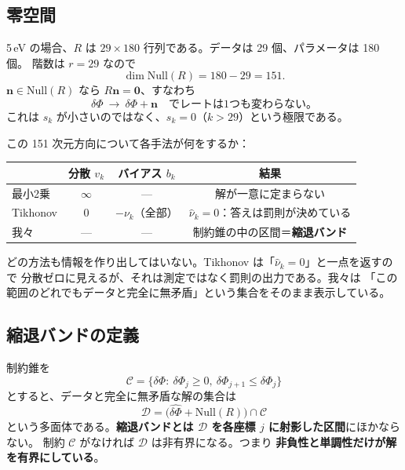 \documentclass[11pt,a4paper]{ltjsarticle}
\newcommand{\dP}{\delta\Phi}
\newcommand{\dPh}{\widehat{\delta\Phi}}
\begin{document}
\subsection*{零空間}
5\,eV の場合、$R$ は $29\times180$ 行列である。データは 29 個、パラメータは 180 個。
階数は $r=29$ なので
\begin{equation}
\dim\mathrm{Null}(R)=180-29=151 .
\end{equation}
$\bm n\in\mathrm{Null}(R)$ なら $R\bm n=\bm 0$、すなわち
\begin{equation}
\dP\ \longrightarrow\ \dP+\bm n \quad\text{でレートは1つも変わらない。}
\end{equation}
これは $s_k$ が小さいのではなく、$s_k=0$（$k>29$）という極限である。

この 151 次元方向について各手法が何をするか：
\begin{center}
\begin{tabular}{lccc}
\toprule
 & 分散 $v_k$ & バイアス $b_k$ & 結果 \\
\midrule
最小2乗 & $\infty$ & --- & 解が一意に定まらない \\
Tikhonov & $0$ & $-\nu_k$（全部） & $\hat\nu_k=0$：答えは罰則が決めている \\
我々 & --- & --- & 制約錐の中の区間＝\textbf{縮退バンド} \\
\bottomrule
\end{tabular}
\end{center}
どの方法も情報を作り出してはいない。Tikhonov は「$\hat\nu_k=0$」と一点を返すので
分散ゼロに見えるが、それは測定ではなく罰則の出力である。我々は
「この範囲のどれでもデータと完全に無矛盾」という集合をそのまま表示している。

\subsection*{縮退バンドの定義}
制約錐を
\begin{equation}
\mathcal{C}=\{\dP:\ \dP_j\ge0,\ \dP_{j+1}\le\dP_j\}
\end{equation}
とすると、データと完全に無矛盾な解の集合は
\begin{equation}
\mathcal{D}=\big(\dPh+\mathrm{Null}(R)\big)\cap\mathcal{C}
\end{equation}
という多面体である。\textbf{縮退バンドとは $\mathcal{D}$ を各座標 $j$ に射影した区間}にほかならない。
制約 $\mathcal{C}$ がなければ $\mathcal{D}$ は非有界になる。つまり
\textbf{非負性と単調性だけが解を有界にしている}。
\end{document}
